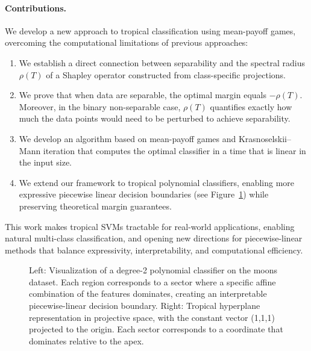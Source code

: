\documentclass{article}
\begin{document}
\paragraph{Contributions.} We develop a new approach to tropical classification using mean-payoff games,
overcoming the computational limitations of previous approaches:

\begin{enumerate}
    \item We establish a direct connection between separability and the spectral radius $\rho(T)$ of a Shapley operator constructed from class-specific projections.
    
    \item We prove that when data are separable, the optimal margin equals $-\rho(T)$. Moreover, in the binary non-separable case, $\rho(T)$ quantifies exactly how much the data points would need to be perturbed to achieve separability.
    
    \item We develop an algorithm based on mean-payoff games and Krasnoselskii--Mann iteration that computes the optimal classifier in a time that is linear in the input size.
    
    \item We extend our framework to tropical polynomial classifiers, enabling more expressive piecewise linear decision boundaries (see Figure~\ref{fig:tropical_poly}) while preserving theoretical margin guarantees.
\end{enumerate}

This work makes tropical SVMs tractable for real-world applications, enabling natural multi-class classification, and opening new directions for piecewise-linear methods that balance expressivity, interpretability, and computational efficiency.

\begin{figure}[h]
    \centering
    \begin{subfigure}[b]{0.58\textwidth}
        \centering
        \resizebox{\textwidth}{!}{\clipbox{0.15\width{} 0.30\height{} 0.15\width{} 0.30\height{}}{}}
        \label{fig:tropical_poly}
    \end{subfigure}
    \hfill
    \begin{subfigure}[b]{0.38\textwidth}
        \centering
        \resizebox{\textwidth}{!}{\clipbox{0.20\width{} 0.20\height{} 0.20\width{} 0.20\height{}}{}}
        \label{fig:hyperplane_example}
    \end{subfigure}
    \caption{Left: Visualization of a degree-2 polynomial classifier on the moons dataset. Each region corresponds to a sector where a specific affine combination of the features dominates, creating an interpretable piecewise-linear decision boundary. Right: Tropical hyperplane representation in projective space, with the constant vector (1,1,1) projected to the origin. Each sector corresponds to a coordinate that dominates relative to the apex.}
    \label{fig:combined}
\end{figure}
\end{document}
